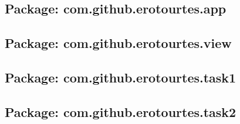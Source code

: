 \subsection{Package: com.github.erotourtes.app}


\subsection{Package: com.github.erotourtes.view}


\subsection{Package: com.github.erotourtes.task1}



\subsection{Package: com.github.erotourtes.task2}


